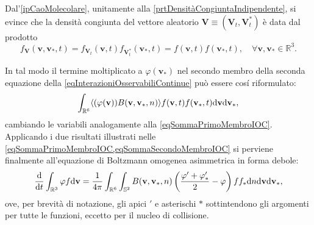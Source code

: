         \begin{oss}
          Dal'\cref{ipCaoMolecolare}, unitamente alla \cref{prtDensitàCongiuntaIndipendente}, si evince che la densità congiunta del vettore aleatorio \(\mathbf V\equiv(\mathbf V_t,\mathbf V^*_t)\) è data dal prodotto
          \[
            f_{\mathbf V}(\mathbf v,\mathbf v_*,t)
            =f_{\mathbf V_t}(\mathbf v,t)f_{\mathbf V^*_t}(\mathbf v_*,t)
            =f(\mathbf v,t)f(\mathbf v_*,t),
            \quad\forall \mathbf v,\mathbf v_*\in\mathbb R^3.
          \]
        \end{oss}

        In tal modo il termine moltiplicato a \(\varphi(\mathbf v_*)\) nel secondo membro della seconda equazione della \eqref{eqInterazioniOsservabiliContinue} può essere cosí riformulato:
        \begin{equation}
          \label{eqSommaSecondoMembroIOC}
          \int_{\mathbb R^6}\langle(\varphi(\mathbf v))
          B(\mathbf v,\mathbf v_*,n)\rangle
          f(\mathbf v,t)f(\mathbf v_*,t)\mathrm{d}\mathbf v\mathrm{d}\mathbf v_*,
        \end{equation}
        cambiando le variabili analogamente alla \eqref{eqSommaPrimoMembroIOC}. Applicando i due risultati illustrati nelle \cref{eqSommaPrimoMembroIOC,eqSommaSecondoMembroIOC} si perviene finalmente all'equazione di Boltzmann omogenea asimmetrica in forma debole:
        \begin{equation}
          \label{eqFormaDeboleBoltzmannOmogeneoAssimmetricoGas}
          \frac{\mathrm{d}}{\mathrm{d}t}\int_{\mathbb R^3}\varphi f\mathrm{d}\mathbf v=
          \frac1{4\pi}\int_{\mathbb R^6}\int_{\mathbb S^2}
              B(\mathbf v,\mathbf v_*,n)
              \left(\frac{\varphi'+\varphi'_*}2-\varphi\right)
          ff_*\mathrm{d} n\mathrm{d}\mathbf v\mathrm{d}\mathbf v_*,
        \end{equation}
        ove, per brevità di notazione, gli apici \(\prime\) e asterischi \(*\) sottintendono gli argomenti\footnotemark{} per tutte le funzioni, eccetto per il nucleo di collisione.
        
